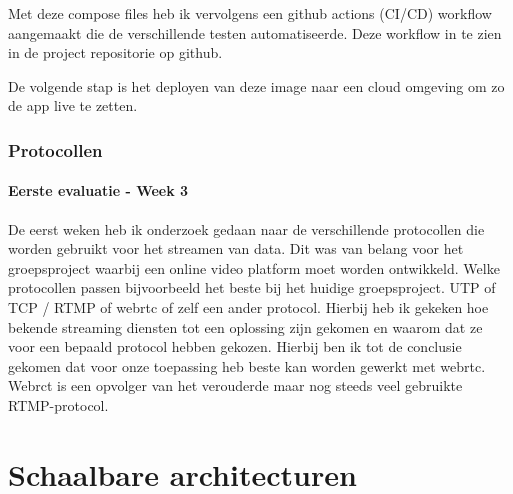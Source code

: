 Met deze compose files heb ik vervolgens een github actions (CI/CD) workflow aangemaakt die de verschillende testen automatiseerde.
Deze workflow in te zien in de project repositorie op github.

De volgende stap is het deployen van deze image naar een cloud omgeving om zo de app live te zetten.

\subsubsection{Protocollen}\label{subsec:protocollen}
\paragraph{Eerste evaluatie - Week 3}
De eerst weken heb ik onderzoek gedaan naar de verschillende protocollen die worden gebruikt voor het streamen van data.
Dit was van belang voor het groepsproject waarbij een online video platform moet worden ontwikkeld.
Welke protocollen passen bijvoorbeeld het beste bij het huidige groepsproject.
UTP of TCP / RTMP of webrtc of zelf een ander protocol.
Hierbij heb ik gekeken hoe bekende streaming diensten tot een oplossing zijn gekomen en waarom dat ze voor een
bepaald protocol hebben gekozen.
Hierbij ben ik tot de conclusie gekomen dat voor onze toepassing heb beste kan worden gewerkt met webrtc.
Webrct is een opvolger van het verouderde maar nog steeds veel gebruikte RTMP-protocol.


\section{Schaalbare architecturen}\label{sec:schaalbare-architecturen}


